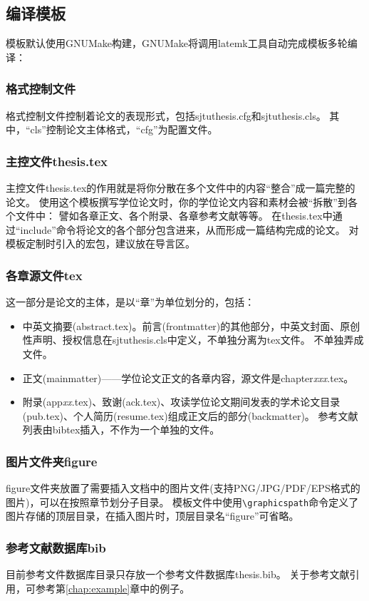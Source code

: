 \subsection{编译模板}
\label{sec:process}

模板默认使用GNUMake构建，GNUMake将调用latemk工具自动完成模板多轮编译：


\subsubsection{格式控制文件}
\label{sec:format}

格式控制文件控制着论文的表现形式，包括sjtuthesis.cfg和sjtuthesis.cls。
其中，“cls”控制论文主体格式，“cfg”为配置文件。

\subsubsection{主控文件thesis.tex}
\label{sec:thesistex}

主控文件thesis.tex的作用就是将你分散在多个文件中的内容“整合”成一篇完整的论文。
使用这个模板撰写学位论文时，你的学位论文内容和素材会被“拆散”到各个文件中：
譬如各章正文、各个附录、各章参考文献等等。
在thesis.tex中通过“include”命令将论文的各个部分包含进来，从而形成一篇结构完成的论文。
对模板定制时引入的宏包，建议放在导言区。

\subsubsection{各章源文件tex}
\label{sec:thesisbody}

这一部分是论文的主体，是以“章”为单位划分的，包括：

\begin{itemize}[noitemsep,topsep=0pt,parsep=0pt,partopsep=0pt]
	\item 中英文摘要(abstract.tex)。前言(frontmatter)的其他部分，中英文封面、原创性声明、授权信息在sjtuthesis.cls中定义，不单独分离为tex文件。
不单独弄成文件。
	\item 正文(mainmatter)——学位论文正文的各章内容，源文件是chapter\emph{xxx}.tex。
	\item 附录(app\emph{xx}.tex)、致谢(ack.tex)、攻读学位论文期间发表的学术论文目录(pub.tex)、个人简历(resume.tex)组成正文后的部分(backmatter)。
参考文献列表由bibtex插入，不作为一个单独的文件。
\end{itemize}

\subsubsection{图片文件夹figure}
\label{sec:fig}

figure文件夹放置了需要插入文档中的图片文件(支持PNG/JPG/PDF/EPS格式的图片)，可以在按照章节划分子目录。
模板文件中使用\verb|\graphicspath|命令定义了图片存储的顶层目录，在插入图片时，顶层目录名“figure”可省略。

\subsubsection{参考文献数据库bib}
\label{sec:bib}

目前参考文件数据库目录只存放一个参考文件数据库thesis.bib。
关于参考文献引用，可参考第\ref{chap:example}章中的例子。

